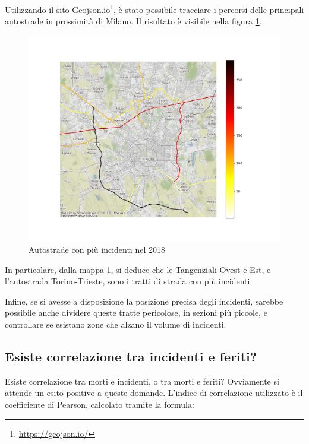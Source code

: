 \documentclass[a4paper]{report}
\begin{document}
Utilizzando il sito Geojson.io\footnote{\url{https://geojson.io/}}, 
è stato possibile tracciare i percorsi delle principali autostrade in prossimità di 
Milano. Il risultato è visibile nella figura \ref{fig:line-incidenti-milano}.

\begin{figure}
    \includegraphics[width=\linewidth]{../src/incidenti/incidenti_aci/autostrade/incidenti_line_chart.png}
    \caption{Autostrade con più incidenti nel 2018}
    \label{fig:line-incidenti-milano}
\end{figure}

In particolare, dalla mappa \ref{fig:line-incidenti-milano}, si deduce che le 
Tangenziali Ovest e Est, e l'autostrada Torino-Trieste, sono i tratti di 
strada con più incidenti.

Infine, se si avesse a disposizione la posizione precisa degli incidenti, 
sarebbe possibile anche dividere queste tratte pericolose, in sezioni più piccole, 
e controllare se esistano zone che alzano il volume di incidenti.

\subsection{Esiste correlazione tra incidenti e feriti?}

Esiste correlazione tra morti e incidenti, o tra morti e feriti?
Ovviamente si attende un esito positivo a queste domande.
L'indice di correlazione utilizzato è il coefficiente di Pearson, calcolato tramite la 
formula: 
\end{document}
